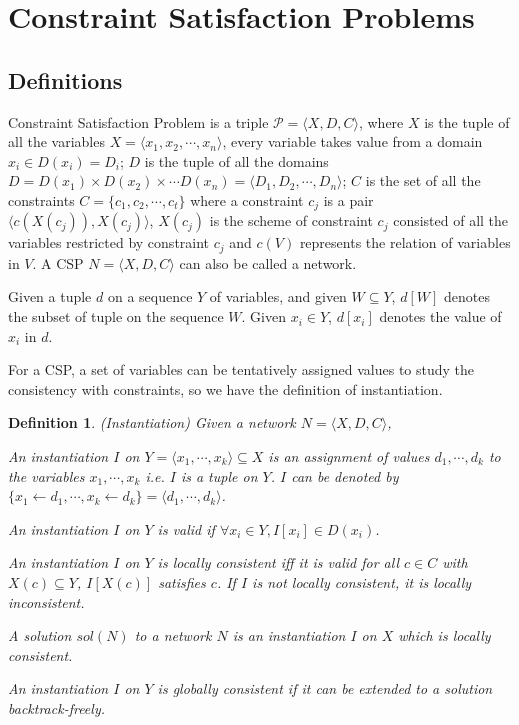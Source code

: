 \documentclass[a4paper, 12pt]{report}
\newtheorem{definition}{Definition}[subsection]
\begin{document}
    
    \section {Constraint Satisfaction Problems}

        \subsection {Definitions}
            Constraint Satisfaction Problem is a triple $\mathcal P=\langle X, D, C\rangle$, where $X$ is the tuple of all the variables $X=\langle x_1,x_2,\cdots,x_n\rangle$, every variable takes value from a domain $x_i\in D(x_i)=D_i$; $D$ is the tuple of all the domains $D=D(x_1)\times D(x_2)\times \cdots D(x_n)=\langle D_1,D_2,\cdots,D_n\rangle$; $C$ is the set of all the constraints $C=\{c_1,c_2,\cdots,c_t\}$ where a constraint $c_j$ is a pair $\langle c(X(c_j)),
            X(c_j)\rangle$, $X(c_j)$ is the scheme of constraint $c_j$ consisted of all the variables restricted by constraint $c_j$ and $c(V)$ represents the relation of variables in $V$. A CSP $N=\langle X,D,C\rangle$ can also be called a network.

            Given a tuple $d$ on a sequence $Y$ of variables, and given $W\subseteq Y$, $d[W]$ denotes the subset of tuple on the sequence $W$. Given $x_i\in Y$, $d[x_i]$ denotes the value of $x_i$ in $d$.

            For a CSP, a set of variables can be tentatively assigned values to study the consistency with constraints, so we have the definition of instantiation\cite{rossi2006handbook}.
            \begin{definition}
                (Instantiation) Given a network $N=\langle X,D,C\rangle$,

                An instantiation $I$ on $Y=\langle x_1,\cdots,x_k\rangle \subseteq X$ is an assignment of values $d_1,\cdots, d_k$ to the variables $x_1, \cdots, x_k$ i.e. $I$ is a tuple on $Y$. $I$ can be denoted by $\{x_1\gets d_1, \cdots, x_k\gets d_k\}=\langle d_1, \cdots, d_k\rangle$.

                An instantiation $I$ on $Y$ is valid if $\forall x_i\in Y, I[x_i]\in D(x_i)$.

                An instantiation $I$ on $Y$ is locally consistent iff it is valid for all $c\in C$ with $X(c)\subseteq Y$, $I[X(c)]$ satisfies $c$. If $I$ is not locally consistent, it is locally inconsistent.

                A solution $sol(N)$ to a network $N$ is an instantiation $I$ on $X$ which is locally consistent. 

                An instantiation $I$ on $Y$ is globally consistent if it can be extended to a solution backtrack-freely.
            \end{definition}
\end{document}
